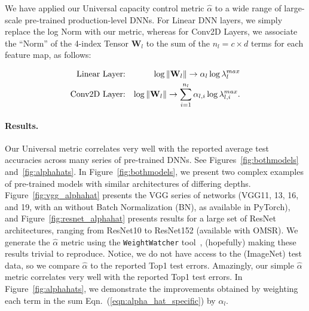 We have applied our Universal capacity control metric $\hat{\alpha}$ to a wide range of large-scale pre-trained production-level DNNs.
For Linear DNN layers, 
we 
simply replace the log Norm with our metric, whereas for Conv2D Layers, 
we 
associate the ``Norm'' of the 4-index Tensor $\mathbf{W}_{l}$ to the sum of the $n_{l}=c\times d$ terms for each feature map, as follows:

\vspace{-6mm}
\begin{eqnarray*}
\text{Linear Layer:} & & \log\Vert\mathbf{W}_{l}\Vert
\rightarrow 
\alpha_{l}\log\lambda_{l}^{max}  \\
\text{Conv2D Layer:} & & \log\Vert\mathbf{W}_{l}\Vert
\rightarrow 
\sum_{i=1}^{n_{l}}\alpha_{l,i} \log\lambda_{l,i}^{max} .
\vspace{-1mm}
\end{eqnarray*}

\vspace{-5mm}
\paragraph{Results.} 
Our Universal metric correlates very well with the reported average test accuracies across many series of pre-trained DNNs.
See Figures~\ref{fig:bothmodels} and~\ref{fig:alphahats}.
In Figure~\ref{fig:bothmodels}, we present two complex examples of pre-trained models with similar architectures of differing depths.  
Figure~\ref{fig:vgg_alphahat} presents the VGG series of networks (VGG11, 13, 16, and 19, with an without Batch Normalization (BN), as available in PyTorch), and 
Figure~\ref{fig:resnet_alphahat} presents results for a large set of ResNet architectures, ranging from ResNet10 to ResNet152 (available with OMSR). 
We generate the $\hat{\alpha}$ metric using the \texttt{WeightWatcher} tool~\cite{weightwatcher_package_justURL}, (hopefully) making these results trivial to reproduce.
Notice, we do not have access to the (ImageNet) test data, so we 
compare $\hat{\alpha}$ to the reported Top1 test errors. 
Amazingly, our simple $\hat{\alpha}$ metric correlates very well with the reported Top1 test errors. 
In Figure~\ref{fig:alphahats}, we demonstrate the improvements obtained by weighting each term in the sum Eqn.~(\ref{eqn:alpha_hat_specific}) by $\alpha_l$.
 
\vspace{-5mm}

